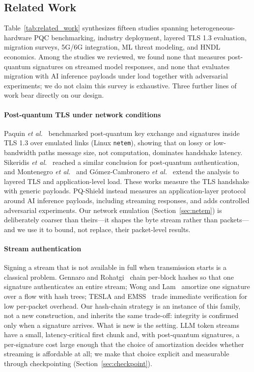 \documentclass[conference]{IEEEtran}
\begin{document}
\subsection{Related Work}
Table~\ref{tab:related_work} synthesizes fifteen studies spanning heterogeneous-hardware PQC
benchmarking, industry deployment, layered TLS 1.3 evaluation, migration surveys, 5G/6G integration,
ML threat modeling, and HNDL economics. Among the studies we reviewed, we found none that measures
post-quantum signatures on streamed model responses, and none that evaluates migration with AI
inference payloads under load together with adversarial experiments; we do not claim this survey is
exhaustive. Three further lines of work bear directly on our design.

\paragraph*{Post-quantum TLS under network conditions}
Paquin \emph{et al.}~\cite{paquin2020benchmarking} benchmarked post-quantum key exchange and
signatures inside TLS 1.3 over emulated links (Linux \texttt{netem}), showing that on lossy or
low-bandwidth paths message size, not computation, dominates handshake latency. Sikeridis
\emph{et al.}~\cite{sikeridis2020authentication} reached a similar conclusion for post-quantum
authentication, and Montenegro \emph{et al.}~\cite{montenegro2026framework} and
G\'omez-Cambronero \emph{et al.}~\cite{gomezcambronero2026layered} extend the analysis to layered TLS
and application-level load. These works measure the TLS handshake with generic payloads. PQ-Shield
instead measures an application-layer protocol around AI inference payloads, including streaming
responses, and adds controlled adversarial experiments. Our network emulation
(Section~\ref{sec:netem}) is deliberately coarser than theirs---it shapes the byte stream rather than
packets---and we use it to bound, not replace, their packet-level results.

\paragraph*{Stream authentication}
Signing a stream that is not available in full when transmission starts is a classical problem.
Gennaro and Rohatgi~\cite{gennaro1997streams} chain per-block hashes so that one signature
authenticates an entire stream; Wong and Lam~\cite{wong1999flows} amortize one signature over a flow
with hash trees; TESLA and EMSS~\cite{perrig2000tesla} trade immediate verification for low
per-packet overhead. Our hash-chain strategy is an instance of this family, not a new construction,
and inherits the same trade-off: integrity is confirmed only when a signature arrives. What is new is
the setting. LLM token streams have a small, latency-critical first chunk and, with post-quantum
signatures, a per-signature cost large enough that the choice of amortization decides whether
streaming is affordable at all; we make that choice explicit and measurable through checkpointing
(Section~\ref{sec:checkpoint}).
\end{document}
